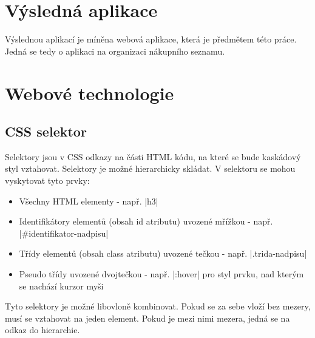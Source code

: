 \section{Výsledná aplikace}
Výslednou aplikací je míněna webová aplikace, která je předmětem této práce. Jedná se tedy o aplikaci na organizaci nákupního seznamu.

\section{Webové technologie}
\subsection{CSS selektor}
\label{sec:css-selektor}
Selektory jsou v CSS odkazy na části HTML kódu, na které se bude kaskádový styl vztahovat. Selektory je možné hierarchicky skládat. V selektoru se mohou vyskytovat tyto prvky:
\begin{itemize}
\item Všechny HTML elementy - např. |h3|
\item Identifikátory elementů (obsah id atributu) uvozené mřížkou - např. |#identifikator-nadpisu|
\item Třídy elementů (obsah class atributu) uvozené tečkou - např. |.trida-nadpisu|
\item Pseudo třídy uvozené dvojtečkou - např. |:hover| pro styl prvku, nad kterým se nachází kurzor myši
\end{itemize}
Tyto selektory je možné libovloně kombinovat. Pokud se za sebe vloží bez mezery, musí se vztahovat na jeden element. Pokud je mezi nimi mezera, jedná se na odkaz do hierarchie.